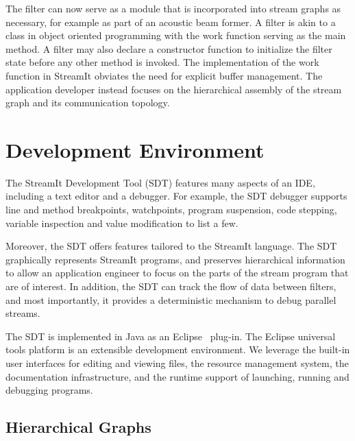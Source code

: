 \documentclass[11pt, letterpaper, onecolumn]{article}
\begin{document}
The filter can now serve as  a module that is incorporated into stream
graphs as necessary, for example as part of an acoustic beam former. A
filter is akin to a class in object oriented programming with the work
function  serving as  the main  method. A  filter may  also  declare a
constructor function  to initialize the filter state  before any other
method is invoked. The implementation of the work function in StreamIt
obviates  the need  for  explicit buffer  management. The  application
developer instead focuses on the  hierarchical assembly of  the stream
graph and its communication topology.


\section{Development Environment}
\label{sec:de}

The StreamIt  Development Tool (SDT)  features many aspects of  an IDE,
including a text editor and  a debugger. For example, the SDT debugger
supports line and method breakpoints, watchpoints, program suspension,
code stepping,  variable inspection and  value modification to  list a
few.

Moreover,   the  SDT   offers  features   tailored  to   the  StreamIt
language.  The  SDT  graphically  represents  StreamIt  programs,  and
preserves hierarchical information to allow an application engineer to
focus on  the parts of  the stream program  that are of  interest. In
addition, the SDT can track the flow of data between filters, and most
importantly, it  provides a deterministic mechanism  to debug parallel
streams.

The SDT  is implemented in Java as  an Eclipse~\cite{eclipse} plug-in.
The  Eclipse universal  tools  platform is  an extensible  development
environment. We leverage the built-in user interfaces for editing and
viewing  files,  the  resource  management system,  the  documentation
infrastructure,  and the  runtime  support of  launching, running  and
debugging programs.



\subsection{Hierarchical Graphs}
\end{document}
